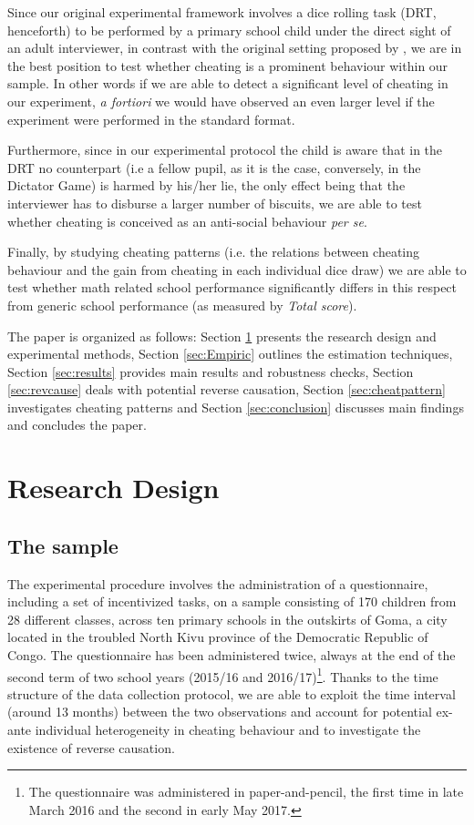 \documentclass[authoryear, preprint, review, 12pt]{elsarticle}
\begin{document}
Since our original experimental framework involves a dice rolling task (DRT, henceforth) to be performed by a primary school child under the direct sight of an adult interviewer, in contrast with the original setting proposed by \cite{ff13}, we are in the best position to test whether cheating is a prominent behaviour within our sample. In other words if we are able to detect a significant level of cheating in our experiment, \textit{a fortiori} we would have observed an even larger level if the experiment were performed in the standard format.  

Furthermore, since in our experimental protocol the child is aware that in the DRT no counterpart (i.e a fellow pupil, as it is the case, conversely, in the Dictator Game) is harmed by his/her lie, the only effect being that the interviewer has to disburse a larger number of biscuits, we are able to test whether cheating is conceived as an anti-social behaviour \textit{per se}.

Finally, by studying cheating patterns (i.e. the relations between cheating behaviour and the gain from cheating in each individual dice draw) we are able to test whether math related school performance significantly differs in this respect from generic school performance (as measured by \textit{Total score}).

The paper is organized as follows: Section \ref{sec:ResDes} presents the research design and experimental methods, Section \ref{sec:Empiric} outlines the estimation techniques, Section \ref{sec:results} provides main results and robustness checks, Section \ref{sec:revcause} deals with potential reverse causation, Section \ref{sec:cheatpattern} investigates cheating patterns and Section \ref{sec:conclusion} discusses main findings and concludes the paper.

\section{Research Design}
\label{sec:ResDes}

\subsection{The sample}
\label{subsec:sample}
The experimental procedure involves the administration of a questionnaire, including a set of incentivized tasks, on a sample consisting of 170 children from 28 different classes, across ten primary schools in the outskirts of Goma, a city located in the troubled North Kivu province of the Democratic Republic of Congo. The questionnaire has been administered twice, always at the end of the second term of two school years (2015/16 and 2016/17)\footnote{The questionnaire was administered in paper-and-pencil, the first time in late March 2016 and the second in early May 2017.}. Thanks to the time structure of the data collection protocol, we are able to exploit the time interval (around 13 months) between the two observations and account for potential ex-ante individual heterogeneity in cheating behaviour and to investigate the existence of reverse causation.
\end{document}
